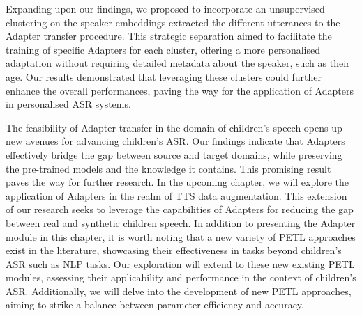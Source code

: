 Expanding upon our findings, we proposed to incorporate an unsupervised clustering on the speaker embeddings extracted the different utterances to the Adapter transfer procedure. This strategic separation aimed to facilitate the training of specific Adapters for each cluster, offering a more personalised adaptation without requiring detailed metadata about the speaker, such as their age. Our results demonstrated that leveraging these clusters could further enhance the overall performances, paving the way for the application of Adapters in personalised ASR systems.

The feasibility of Adapter transfer in the domain of children's speech opens up new avenues for advancing children's ASR. Our findings indicate that Adapters effectively bridge the gap between source and target domains, while preserving the pre-trained models and the knowledge it contains. This promising result paves the way for further research. In the upcoming chapter, we will explore the application of Adapters in the realm of TTS data augmentation. This extension of our research seeks to leverage the capabilities of Adapters for reducing the gap between real and synthetic children speech.
In addition to presenting the Adapter module in this chapter, it is worth noting that a new variety of PETL approaches exist in the literature, showcasing their effectiveness in tasks beyond children's ASR such as NLP tasks. Our exploration will extend to these new existing PETL modules, assessing their applicability and performance in the context of children's ASR. Additionally, we will delve into the development of new PETL approaches, aiming to strike a balance between parameter efficiency and accuracy. 



